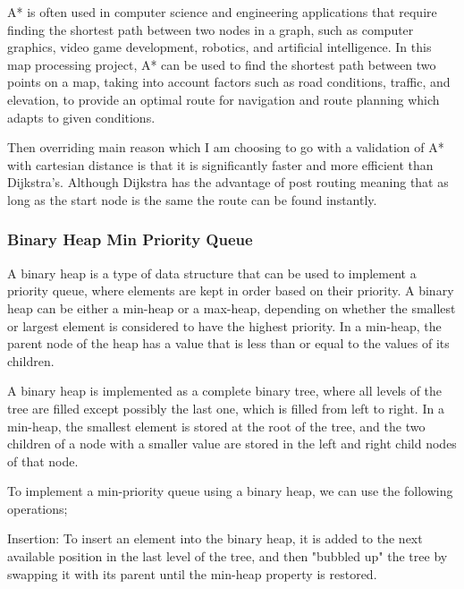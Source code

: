 \begin{FlushLeft}
    A* is often used in computer science and engineering applications that require finding the shortest path between two nodes in a graph, such as computer graphics, video game development, robotics, and artificial intelligence. In this map processing project, A* can be used to find the shortest path between two points on a map, taking into account factors such as road conditions, traffic, and elevation, to provide an optimal route for navigation and route planning which adapts to given conditions. \\ \bk

    Then overriding main reason which I am choosing to go with a validation of A* with cartesian distance is that it is significantly faster and more efficient than Dijkstra's. Although Dijkstra has the advantage of post routing meaning that as long as the start node is the same the route can be found instantly. 
    \bk

    \subsubsection{Binary Heap Min Priority Queue}
    A binary heap is a type of data structure that can be used to implement a priority queue, where elements are kept in order based on their priority. A binary heap can be either a min-heap or a max-heap, depending on whether the smallest or largest element is considered to have the highest priority. In a min-heap, the parent node of the heap has a value that is less than or equal to the values of its children.\\ \bk

    A binary heap is implemented as a complete binary tree, where all levels of the tree are filled except possibly the last one, which is filled from left to right. In a min-heap, the smallest element is stored at the root of the tree, and the two children of a node with a smaller value are stored in the left and right child nodes of that node.\\ \bk
    
    To implement a min-priority queue using a binary heap, we can use the following operations;\\ \bk

    Insertion: To insert an element into the binary heap, it is added to the next available position in the last level of the tree, and then "bubbled up" the tree by swapping it with its parent until the min-heap property is restored.\\ \bk
    

\end{FlushLeft}
